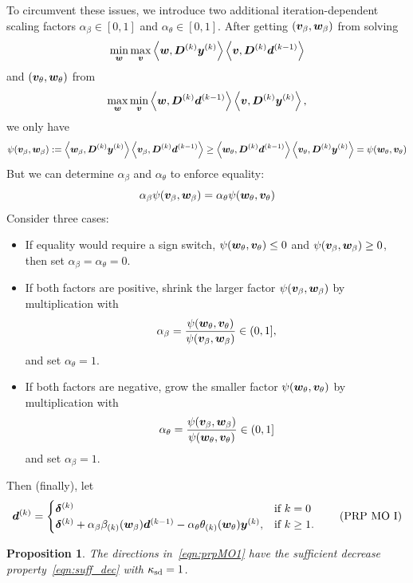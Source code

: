 \documentclass{article}
\theoremstyle{plain}
\newtheorem{proposition}[theorem]{Proposition}
\theoremstyle{definition}
\begin{document}
To circumvent these issues, we introduce two additional 
iteration-dependent scaling factors $\alpha_\beta \in [0,1]$
and $\alpha_\theta \in [0,1]$.
After getting $(\bm{v}_\beta, \bm{w}_\beta)$ from solving
$$
\min_{\bm{w}}\max_{\bm{v}}
\left\langle \bm{w}, \bm{D}^{(k)} \bm{y}^{(k)} \right\rangle
\left\langle \bm{v}, \bm{D}^{(k)} \bm{d}^{(k-1)} \right\rangle
$$
and $(\bm{v}_\theta, \bm{w}_\theta)$ from
$$
\max_{\bm{w}}\min_{\bm{v}}
\left\langle \bm{w}, \bm{D}^{(k)} \bm{d}^{(k-1)} \right\rangle
\left\langle \bm{v}, \bm{D}^{(k)} \bm{y}^{(k)} \right\rangle,
$$
we only have
$$
\psi(\bm{v}_\beta, \bm{w}_\beta)
:=
\left\langle \bm{w}_\beta, \bm{D}^{(k)} \bm{y}^{(k)} \right\rangle
\left\langle \bm{v}_\beta, \bm{D}^{(k)} \bm{d}^{(k-1)} \right\rangle
\geq
\left\langle \bm{w}_\theta, \bm{D}^{(k)} \bm{d}^{(k-1)} \right\rangle
\left\langle \bm{v}_\theta, \bm{D}^{(k)} \bm{y}^{(k)} \right\rangle
=
\psi(\bm{w}_\theta, \bm{v}_\theta)
$$
But we can determine $\alpha_\beta$ and $\alpha_\theta$
to enforce equality:
$$
\alpha_\beta
\psi(\bm{v}_\beta, \bm{w}_\beta)
=
\alpha_\theta
\psi(\bm{w}_\theta, \bm{v}_\theta)
$$
Consider three cases:
\begin{itemize}
	\item If equality would require a sign switch, 
		$\psi(\bm{w}_\theta, \bm{v}_\theta) \leq 0$ and 
		$\psi(\bm{v}_\beta, \bm{w}_\beta) \geq 0$, then set
		$\alpha_\beta = \alpha_\theta = 0$.
	\item If both factors are positive, shrink the larger factor
		$\psi(\bm{v}_\beta, \bm{w}_\beta)$ by multiplication with
		$$
		\alpha_\beta = \frac{\psi(\bm{w}_\theta, \bm{v}_\theta)}{\psi(\bm{v}_\beta, \bm{w}_\beta)}
		\in (0,1],
		$$
		and set $\alpha_\theta = 1$.
	\item If both factors are negative, grow the smaller factor
		$\psi(\bm{w}_\theta, \bm{v}_\theta)$ by multiplication with
		$$
		\alpha_\theta = 
		\frac{\psi(\bm{v}_\beta, \bm{w}_\beta)}{\psi(\bm{w}_\theta, \bm{v}_\theta)}
		\in (0, 1]
		$$
		and set $\alpha_\beta = 1$.
\end{itemize}

Then (finally), let
\begin{equation}
\bm{d}^{(k)} =
\begin{cases}
	\bm{\delta}^{(k)} 
		& \text{if $k=0$}
		\\
	\bm{\delta}^{(k)} + 
	\alpha_\beta \beta_{(k)}(\bm{w}_\beta)
		\bm{d}^{(k-1)}
	-\alpha_\theta
	\theta_{(k)}(\bm{w}_\theta)
		\bm{y}^{(k)},
	&\text{if $k \geq 1$.}
\end{cases}
\tag{PRP~MO~I}
\label{eqn:prpMO1}
\end{equation}

\begin{proposition}
	The directions in~\eqref{eqn:prpMO1}
	have the sufficient decrease property~\eqref{eqn:suff_dec}
	with $\kappa_{\mathrm{sd}}=1$.
\end{proposition}
\end{document}
